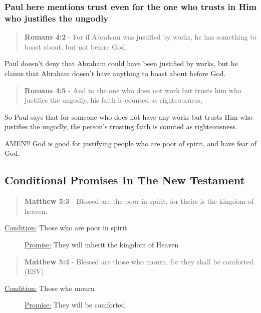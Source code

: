 \documentclass[11pt]{article}
\begin{document}
\subsubsection{Paul here mentions trust even for the one who trusts in Him who justifies the ungodly}
\label{sec:org6553a5b}
\begin{quote}
\textbf{Romans 4:2} - For if Abraham was justified by works, he has something to boast about, but not before God.
\end{quote}

Paul doesn't deny that Abraham could have been
justified by works, but he claims that Abraham
doesn't have anything to boast about before
God.

\begin{quote}
\textbf{Romans 4:5} - And to the one who does not work but trusts him who justifies the ungodly, his faith is counted as righteousness,
\end{quote}

So Paul says that for someone who does not
have any works but trusts Him who justifies
the ungodly, the person's trusting faith is
counted as righteousness.

AMEN!! God is good for justifying people who are poor of spirit, and have fear of God.

\subsection{Conditional Promises In The New Testament}
\label{sec:orgc7cf6bf}
\begin{quote}
\textbf{Matthew 5:3} - Blessed are the poor in spirit, for theirs is the kingdom of heaven.
\end{quote}

\begin{description}
\item[{\uline{Condition:} Those who are poor in spirit}] \uline{Promise:} They will inherit the kingdom of Heaven
\end{description}

\begin{quote}
\textbf{Matthew 5:4} - Blessed are those who mourn, for they shall be comforted. (ESV)
\end{quote}

\begin{description}
\item[{\uline{Condition:} Those who mourn}] \uline{Promise:} They will be comforted
\end{description}
\end{document}
